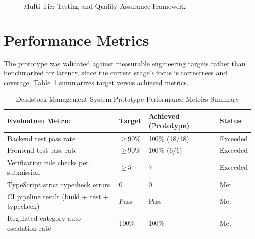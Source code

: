 \documentclass[11pt,a4paper]{report}
\begin{document}
\begin{figure}[h]
\centering
{}
\caption{Multi-Tier Testing and Quality Assurance Framework}
\end{figure}

\section{Performance Metrics}
The prototype was validated against measurable engineering targets rather
than benchmarked for latency, since the current stage's focus is
correctness and coverage. Table~\ref{tab:metrics} summarizes target versus achieved
metrics.

\begin{table}[h]
\centering
\begin{tabular}{@{}p{5.1cm}p{2.6cm}p{2.9cm}p{1.6cm}@{}}
\toprule
\textbf{Evaluation Metric} & \textbf{Target} & \textbf{Achieved (Prototype)} & \textbf{Status} \\
\midrule
Backend test pass rate & $\geq 90\%$ & 100\% (18/18) & Exceeded \\
Frontend test pass rate & $\geq 90\%$ & 100\% (6/6) & Exceeded \\
Verification rule checks per submission & $\geq 5$ & 7 & Exceeded \\
TypeScript strict typecheck errors & 0 & 0 & Met \\
CI pipeline result (build + test + typecheck) & Pass & Pass & Met \\
Regulated-category auto-escalation rate & 100\% & 100\% & Met \\
\bottomrule
\end{tabular}
\caption{Deadstock Management System Prototype Performance Metrics Summary}
\label{tab:metrics}
\end{table}
\end{document}
